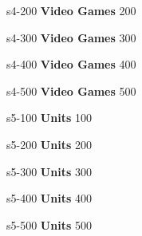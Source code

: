 \documentclass{beamer}
\def \fourthcat {\textbf{Video Games}}
\def \fifthcat {\textbf{Units}}
\begin{document}
	\content
	{s4-200}
	{\fourthcat}
	{200}{
    \db
	}


	\content
	{s4-300}
	{\fourthcat}
	{300}{
    \dc
	}


	\content
	{s4-400}
	{\fourthcat}
	{400}{
    \dd
	}


	\content
	{s4-500}
	{\fourthcat}
	{500}{
    \de
	}


	\content
	{s5-100}
	{\fifthcat}
	{100}{
    \ea
	}


	\content
	{s5-200}
	{\fifthcat}
	{200}{
    \eb
	}


	\content
	{s5-300}
	{\fifthcat}
	{300}{
    \ec
	}


	\content
	{s5-400}
	{\fifthcat}
	{400}{
    \ed
	}


	\content
	{s5-500}
	{\fifthcat}
	{500}{
    \ee
	}
\end{document}
